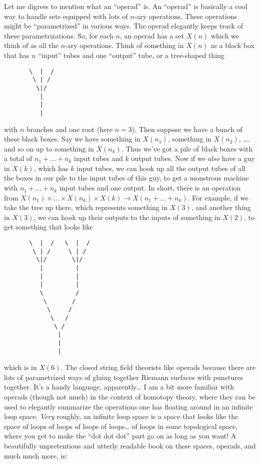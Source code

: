 \documentclass{article}
\begin{document}
Let me digress to mention what an ``operad'' is. An ``operad'' is
basically a cool way to handle sets equipped with lots of \(n\)-ary
operations. These operations might be ``parametrized'' in various ways.
The operad elegantly keeps track of these parametrizations. So, for each
\(n\), an operad has a set \(X(n)\) which we think of as all the
\(n\)-ary operations. Think of something in \(X(n)\) as a black box that
has \(n\) ``input'' tubes and one ``output'' tube, or a tree-shaped
thing

\begin{verbatim}
       \  |  /
        \ | /
         \|/
          |
          |
          |
\end{verbatim}

with \(n\) branches and one root (here \(n = 3\)). Then suppose we have
a bunch of these black boxes. Say we have something in \(X(n_1)\),
something in \(X(n_2)\), \ldots. and so on up to something in
\(X(n_k)\). Thus we've got a pile of black boxes with a total of
\(n_1 + \ldots + n_k\) input tubes and \(k\) output tubes. Now if we
\emph{also} have a guy in \(X(k)\), which has \(k\) input tubes, we can
hook up all the output tubes of all the boxes in our pile to the input
tubes of this guy, to get a monstrous machine with
\(n_1 + \ldots + n_k\) input tubes and one output. In short, there is an
operation from
\(X(n_1)\times \ldots\times X(n_k)\times X(k) \to X(n_1 + \ldots + n_k)\).
For example, if we take the tree up there, which represents something in
\(X(3)\), and another thing in \(X(3)\), we can hook up their outputs to
the inputs of something in \(X(2)\), to get something that looks like

\begin{verbatim}
       \  |  /   \  |  /
        \ | /     \ | /
         \|/       \|/
          |         |
          |         |
          |         |
          \         /
           \       /
            \     / 
             \   /
              \ /
               |
               |
               |
\end{verbatim}

which is in \(X(6)\). The closed string field theorists like operads
because there are lots of parametrized ways of gluing together Riemann
surfaces with punctures together. It's a handy language,
apparently\ldots{} I am a bit more familiar with operads (though not
much) in the context of homotopy theory, where they can be used to
elegantly summarize the operations one has floating around in an
infinite loop space. \emph{Very} roughly, an infinite loop space is a
space that looks like the space of loops of loops of loops of
loops\ldots{} of loops in some topological space, where you get to make
the ``dot dot dot'' part go on as long as you want! A beautifully
unpretentious and utterly readable book on these spaces, operads, and
much much more, is:
\end{document}
